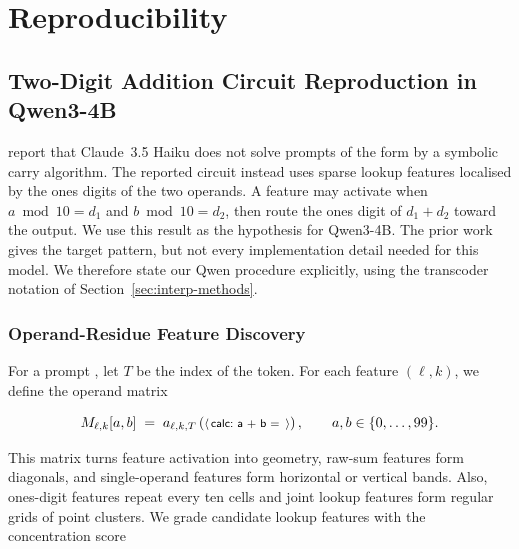 \chapter{Reproducibility}
\label{sec:repro}

\makeatletter
{}
\makeatother

\section{Two-Digit Addition Circuit Reproduction in Qwen3-4B}

\citet{lindsey2025biology} report that Claude~3.5 Haiku does not solve
prompts of the form  by a symbolic carry
algorithm.  The reported circuit instead uses sparse lookup features localised
by the ones digits of the two operands.  A feature may activate when
$a \bmod 10 = d_1$ and $b \bmod 10 = d_2$, then route the ones digit of
$d_1+d_2$ toward the output.  We use this result as the hypothesis for Qwen3-4B.  The
prior work gives the target pattern, but not every implementation detail needed
for this model.  We therefore state our Qwen procedure explicitly, using the
transcoder notation of Section~\ref{sec:interp-methods}.

\subsection{Operand-Residue Feature Discovery}
\label{subsec:operand-plots}

For a prompt , let $T$ be the index of the
\promptinline{=} token.  For each feature $(\ell,k)$, we define the operand
matrix

\begin{equation}
  M_{\ell,k}[a,b]
    \;=\; a_{\ell,k,T}
          \left( \text{\mbox{\normalfont\footnotesize\sffamily\(\langle\)\,calc:~a + b =~\,\(\rangle\)}}\right),
    \qquad a,b \in \{0,\ldots,99\}.
  \label{eq:operand-matrix}
\end{equation}

This matrix turns feature activation into geometry, raw-sum features form
diagonals, and single-operand features form horizontal or vertical bands.
Also, ones-digit features repeat every ten cells and joint lookup features form regular
grids of point clusters.  We grade candidate lookup features with the
concentration score

